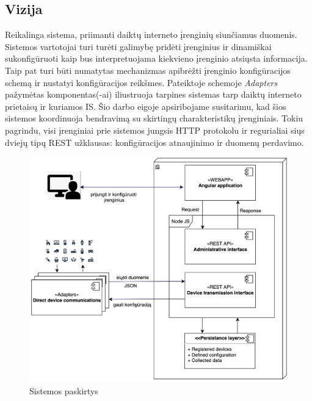 \documentclass{VUMIFInfBakalaurinis}
\begin{document}
\subsection{Vizija}
Reikalinga sistema, priimanti daiktų interneto įrenginių siunčiamus duomenis.
Sistemos vartotojai turi turėti galimybę pridėti įrenginius ir dinamiškai sukonfigūruoti kaip bus interpretuojama kiekvieno įrenginio atsiųsta informacija.
Taip pat turi būti numatytas mechanizmas apibrėžti įrenginio konfigūracijos schemą ir nustatyi konfigūracijos reikšmes.
Pateiktoje schemoje \emph{Adapters} pažymėtas komponentas(-ai) iliustruoja tarpines sistemas tarp daiktų interneto prietaisų ir kuriamos IS.
Šio darbo eigoje apsiribojame susitarimu, kad šios sistemos koordinuoja bendravimą su skirtingų charakteristikų įrenginiais.
Tokiu pagrindu, visi įrenginiai prie sistemos jungsis HTTP protokolu ir regurialiai siųs dviejų tipų REST užklausas: konfigūracijos atnaujinimo ir duomenų perdavimo.
\begin{figure}[H]
    \centering
    \includegraphics[scale=0.7]{img/vision-s}
    \caption{Sistemos paskirtys}   %
    \label{img:mlp}
\end{figure}
\end{document}
